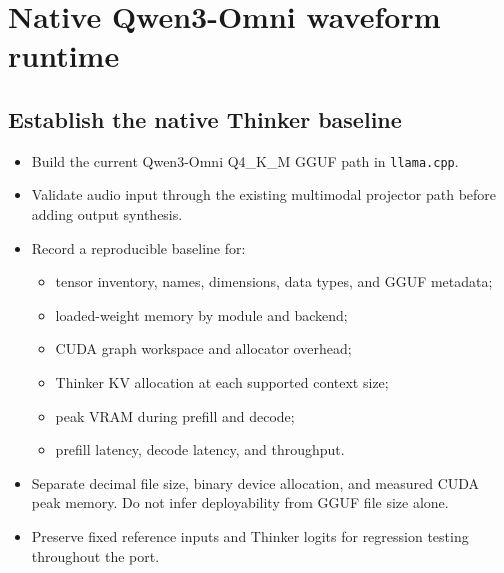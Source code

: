 \documentclass[10pt,letterpaper]{article}
\newcommand{\code}[1]{\texttt{#1}}
\begin{document}
\section{Native Qwen3-Omni waveform runtime}

\subsection{Establish the native Thinker baseline}
\begin{itemize}
    \item Build the current Qwen3-Omni Q4\_K\_M GGUF path in \code{llama.cpp}.
    \item Validate audio input through the existing multimodal projector path before adding output synthesis.
    \item Record a reproducible baseline for:
    \begin{itemize}
        \item tensor inventory, names, dimensions, data types, and GGUF metadata;
        \item loaded-weight memory by module and backend;
        \item CUDA graph workspace and allocator overhead;
        \item Thinker KV allocation at each supported context size;
        \item peak VRAM during prefill and decode;
        \item prefill latency, decode latency, and throughput.
    \end{itemize}
    \item Separate decimal file size, binary device allocation, and measured CUDA peak memory. Do not infer deployability from GGUF file size alone.
    \item Preserve fixed reference inputs and Thinker logits for regression testing throughout the port.
\end{itemize}
\end{document}
